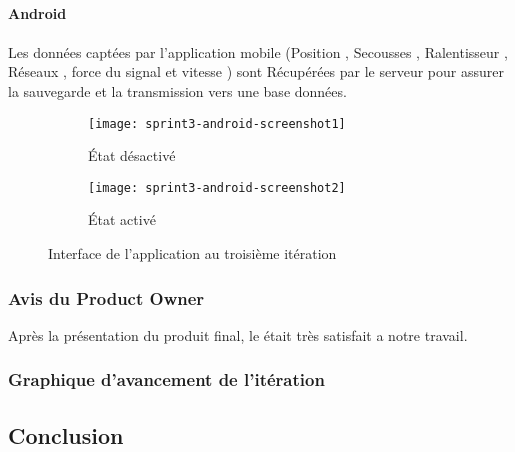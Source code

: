 \paragraph{Android}
\paragraph*{}
Les données captées par l'application mobile (Position , Secousses , Ralentisseur , Réseaux , force du 
signal et vitesse ) sont Récupérées par le serveur pour assurer la sauvegarde et la transmission vers une 
base données.\\

\begin{figure}[htbp]
    \begin{subfigure}{.5\textwidth}
    \centering
  \centering
  \texttt{[image: sprint3-android-screenshot1]}
  \caption{État désactivé}
  \label{fig:sprint3-android-screenshot1}
\end{subfigure}
\begin{subfigure}{.5\textwidth}
    \centering
  \centering
  \texttt{[image: sprint3-android-screenshot2]}
  \caption{État activé}
  \label{fig:sprint3-android-screenshot2}
\end{subfigure}
\caption{Interface de l'application au troisième itération}
\end{figure}
\clearpage

\subsubsection{Avis du Product Owner}

Après la présentation du produit final, le  était très satisfait
a notre travail.

\subsubsection{Graphique d'avancement de l'itération}


\subsection{Conclusion}

